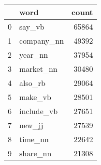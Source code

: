 \begin{tabular}{llr}
\toprule
{} &        word &  count \\
\midrule
0 &      say\_vb &  65864 \\
1 &  company\_nn &  49392 \\
2 &     year\_nn &  37954 \\
3 &   market\_nn &  30480 \\
4 &     also\_rb &  29064 \\
5 &     make\_vb &  28501 \\
6 &  include\_vb &  27651 \\
7 &      new\_jj &  27539 \\
8 &     time\_nn &  22642 \\
9 &    share\_nn &  21308 \\
\bottomrule
\end{tabular}
